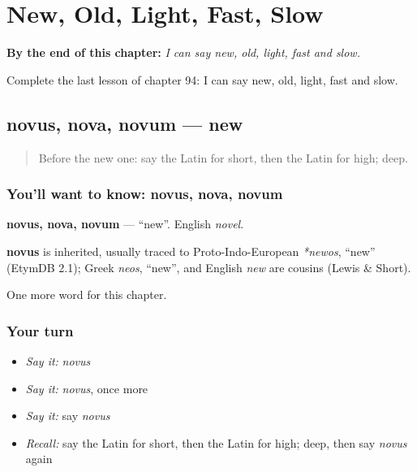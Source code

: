 
\chapter{New, Old, Light, Fast, Slow}
\label{ch:la-new-old-light-fast-slow}

\begin{chapteropening}
\textbf{By the end of this chapter:} \emph{I can say new, old, light, fast and slow.}

Complete the last lesson of chapter 94: I can say new, old, light, fast and slow.
\end{chapteropening}

\section[novus, nova, novum]{novus, nova, novum — new}

\label{lesson:LA-C94-novus}



\begin{quote}
Before the new one: say the Latin for short, then the Latin for high; deep.
\end{quote}

\subsection*{You'll want to know: novus, nova, novum}
\textbf{novus, nova, novum} — \textquotedblleft{}new\textquotedblright{}. English \emph{novel}.

\begin{cousinweb}
\textbf{novus} is inherited, usually traced to Proto-Indo-European \emph{*newos}, \textquotedblleft{}new\textquotedblright{} (EtymDB 2.1); Greek \emph{neos}, \textquotedblleft{}new\textquotedblright{}, and English \emph{new} are cousins (Lewis \& Short).
\end{cousinweb}

\begin{grammarlens}[title={What you've built}]
One more word for this chapter.
\end{grammarlens}

\subsection*{Your turn}
\begin{itemize}
\raggedright
  \item \emph{Say it:} \emph{novus}
  \item \emph{Say it:} \emph{novus}, once more
  \item \emph{Say it:} say \emph{novus}
  \item \emph{Recall:} say the Latin for short, then the Latin for high; deep, then say \emph{novus} again
\end{itemize}

